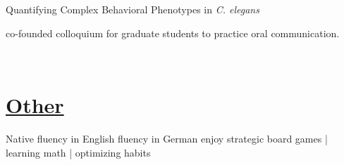 \documentclass[]{winter-resume-openfont}
\begin{document}
\begin{minipage}[t]{0.65\textwidth}
\begin{tightemize}
\item {} Quantifying Complex Behavioral Phenotypes in \emph{C. elegans}

\item co-founded colloquium for graduate students to practice oral communication.
\end{tightemize}

\sectionsep

 \\
\sectionsep

\section{\underline{Other}}
Native fluency in English \textbullet{} fluency in German \textbullet{} enjoy strategic board games | learning math | optimizing habits




\end{minipage} 
\hfill
\end{document}

